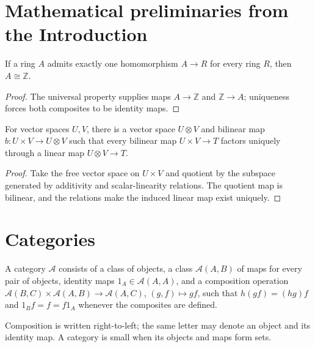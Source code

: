 \section*{Mathematical preliminaries from the Introduction}
\begin{lemma}
\label{lem:lbc-intro-integers}
If a ring $A$ admits exactly one homomorphism $A\to R$ for every ring $R$, then
$A\cong\mathbb Z$.
\end{lemma}
\begin{proof}
The universal property supplies maps $A\to\mathbb Z$ and $\mathbb Z\to A$;
uniqueness forces both composites to be identity maps.
\end{proof}

\begin{lemma}
\label{lem:lbc-intro-tensor}
For vector spaces $U,V$, there is a vector space $U\otimes V$ and bilinear map
$b:U\times V\to U\otimes V$ such that every bilinear map $U\times V\to T$
factors uniquely through a linear map $U\otimes V\to T$.
\end{lemma}
\begin{proof}
Take the free vector space on $U\times V$ and quotient by the subspace
generated by additivity and scalar-linearity relations. The quotient map is
bilinear, and the relations make the induced linear map exist uniquely.
\end{proof}
\section{Categories}
\begin{definition}[Category]
\label{def:lbc-category}
A category $\mathcal A$ consists of a class of objects, a class
$\mathcal A(A,B)$ of maps for every pair of objects, identity maps
$1_A\in\mathcal A(A,A)$, and a composition operation
$\mathcal A(B,C)\times\mathcal A(A,B)\to\mathcal A(A,C)$, $(g,f)\mapsto gf$,
such that $h(gf)=(hg)f$ and $1_Bf=f=f1_A$ whenever the composites are defined.
\end{definition}

\begin{remark}
\label{rem:lbc-composition}
Composition is written right-to-left; the same letter may denote an object and
its identity map. A category is small when its objects and maps form sets.
\end{remark}

